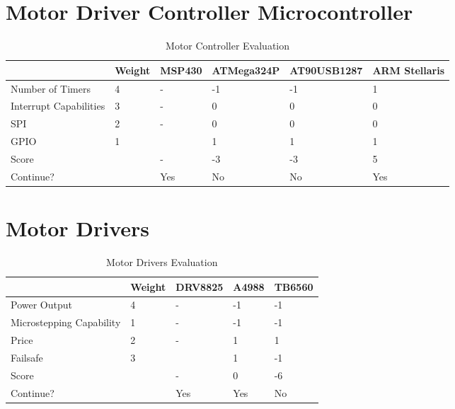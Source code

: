 \section{Motor Driver Controller Microcontroller}
\begin{table}[h]
\caption{Motor Controller Evaluation}
	\label{table:uCEval}
	\centering
\begin{tabular}{l|l|l|l|l|l|}
\cline{2-6}
                                              & Weight & MSP430 & ATMega324P & AT90USB1287 & ARM Stellaris \\ \hline
\multicolumn{1}{|l|}{Number of Timers}        & 4      & -      & -1         & -1          & 1             \\ \hline
\multicolumn{1}{|l|}{Interrupt Capabilities } & 3      & -      & 0          & 0           & 0             \\ \hline
\multicolumn{1}{|l|}{SPI}                     & 2      & -      & 0          & 0           & 0             \\ \hline
\multicolumn{1}{|l|}{GPIO}                    & 1      &        & 1          & 1           & 1             \\ \hline
\multicolumn{1}{|l|}{Score}                   &        & -      & -3         & -3          & 5             \\ \hline
\multicolumn{1}{|l|}{Continue?}               &        & Yes    & No         & No          & Yes           \\ \hline
\end{tabular}
\end{table}

\section{Motor Drivers}
\begin{table}[h]
\caption{Motor Drivers Evaluation}
	\label{table:MCEval}
	\centering
\begin{tabular}{|l|l|l|l|l|}
\hline
                         & Weight & DRV8825 & A4988 & TB6560 \\ \hline
Power Output             & 4      & -       & -1    & -1     \\ \hline
Microstepping Capability & 1      & -       & -1    & -1     \\ \hline
Price                    & 2      & -       & 1     & 1      \\ \hline
Failsafe                 & 3      &         & 1     & -1     \\ \hline
Score                    &        & -       & 0     & -6     \\ \hline
Continue?                &        & Yes     & Yes   & No     \\ \hline
\end{tabular}
\end{table}


